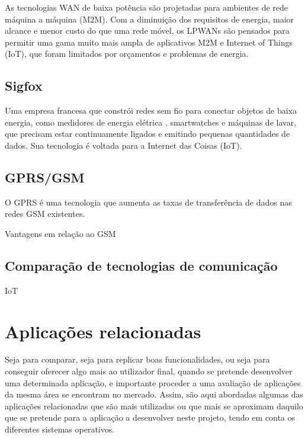 As tecnologias WAN de baixa potência são projetadas para ambientes de rede máquina a máquina (M2M). Com a diminuição dos requisitos de energia, maior alcance e menor custo do que uma rede móvel, os LPWANs são pensados para permitir uma gama muito mais ampla de aplicativos M2M e Internet of Things (IoT), que foram limitados por orçamentos e problemas de energia.



\subsection{Sigfox}

Uma empresa francesa que constrói redes sem fio para conectar objetos de baixa energia, como medidores de energia elétrica , smartwatches e máquinas de lavar, que precisam estar continuamente ligados e emitindo pequenas quantidades de dados. Sua tecnologia é voltada para a Internet das Coisas (IoT).
 


\subsection{GPRS/GSM}


O \ac{GPRS} é uma tecnologia que aumenta as taxas de transferência de dados nas redes \ac{GSM} existentes. 


Vantagens em relação ao GSM


\subsection{Comparação de tecnologias de comunicação}





\ac{IoT}


\section{Aplicações relacionadas}



Seja para comparar, seja para replicar boas funcionalidades, ou seja para conseguir oferecer algo mais ao utilizador final, quando se pretende desenvolver uma determinada aplicação, e
importante proceder a uma avaliação de aplicações da mesma área se encontram no mercado.
Assim, são aqui abordadas algumas das aplicações relacionadas que são mais utilizadas ou que mais se aproximam daquilo que se pretende para a aplicação a desenvolver neste projeto,
tendo em conta os diferentes sistemas operativos.



